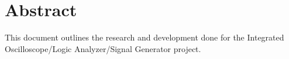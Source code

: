 \section{Abstract}
	This document outlines the research and development done for the Integrated Oscilloscope/Logic Analyzer/Signal Generator project. 
